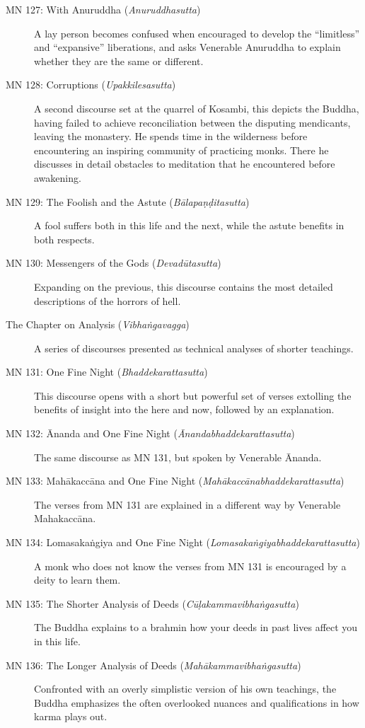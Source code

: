\documentclass[12pt,openany]{book}%
\begin{document}
\begin{description}
\item[MN 127: With Anuruddha (\textit{\textsanskrit{Anuruddhasutta}})] A lay person becomes confused when encouraged to develop the “limitless” and “expansive” liberations, and asks Venerable Anuruddha to explain whether they are the same or different.%
\item[MN 128: Corruptions (\textit{\textsanskrit{Upakkilesasutta}})] A second discourse set at the quarrel of Kosambi, this depicts the Buddha, having failed to achieve reconciliation between the disputing mendicants, leaving the monastery. He spends time in the wilderness before encountering an inspiring community of practicing monks. There he discusses in detail obstacles to meditation that he encountered before awakening.%
\item[MN 129: The Foolish and the Astute (\textit{\textsanskrit{Bālapaṇḍitasutta}})] A fool suffers both in this life and the next, while the astute benefits in both respects.%
\item[MN 130: Messengers of the Gods (\textit{\textsanskrit{Devadūtasutta}})] Expanding on the previous, this discourse contains the most detailed descriptions of the horrors of hell.%
\item[The Chapter on Analysis (\textit{\textsanskrit{Vibhaṅgavagga}})] A series of discourses presented as technical analyses of shorter teachings.%
\item[MN 131: One Fine Night (\textit{\textsanskrit{Bhaddekarattasutta}})] This discourse opens with a short but powerful set of verses extolling the benefits of insight into the here and now, followed by an explanation.%
\item[MN 132: Ānanda and One Fine Night (\textit{\textsanskrit{Ānandabhaddekarattasutta}})] The same discourse as MN 131, but spoken by Venerable Ānanda.%
\item[MN 133: \textsanskrit{Mahākaccāna} and One Fine Night (\textit{\textsanskrit{Mahākaccānabhaddekarattasutta}})] The verses from MN 131 are explained in a different way by Venerable \textsanskrit{Mahakaccāna}.%
\item[MN 134: \textsanskrit{Lomasakaṅgiya} and One Fine Night (\textit{\textsanskrit{Lomasakaṅgiyabhaddekarattasutta}})] A monk who does not know the verses from MN 131 is encouraged by a deity to learn them.%
\item[MN 135: The Shorter Analysis of Deeds (\textit{\textsanskrit{Cūḷakammavibhaṅgasutta}})] The Buddha explains to a brahmin how your deeds in past lives affect you in this life.%
\item[MN 136: The Longer Analysis of Deeds (\textit{\textsanskrit{Mahākammavibhaṅgasutta}})] Confronted with an overly simplistic version of his own teachings, the Buddha emphasizes the often overlooked nuances and qualifications in how karma plays out.%

\end{description}
\end{document}

